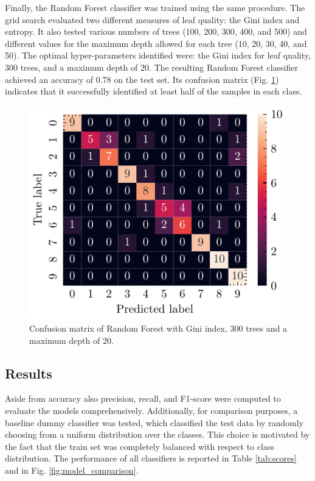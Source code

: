 \documentclass[journal]{IEEEtran}
\begin{document}
Finally, the Random Forest classifier was trained using the same procedure. The grid search evaluated two different measures of leaf quality: the Gini index and entropy. It also tested various numbers of trees (100, 200, 300, 400, and 500) and different values for the maximum depth allowed for each tree (10, 20, 30, 40, and 50). The optimal hyper-parameters identified were: the Gini index for leaf quality, 300 trees, and a maximum depth of 20. The resulting Random Forest classifier achieved an accuracy of 0.78 on the test set. Its confusion matrix (Fig. \ref{fig:rf_confusion_matrix}) indicates that it successfully identified at least half of the samples in each class.
\begin{figure}[ht]
    \centering
    \includegraphics[width=\linewidth]{confusion_matrix_rf.pdf}
    \caption{Confusion matrix of Random Forest with Gini index, 300 trees and a maximum depth of 20.}
    \label{fig:rf_confusion_matrix}
\end{figure}

\subsection{Results}
Aside from accuracy also precision, recall, and F1-score were computed to evaluate the models comprehensively. Additionally, for comparison purposes, a baseline dummy classifier was tested, which classified the test data by randomly choosing from a uniform distribution over the classes. This choice is motivated by the fact that the train set was completely balanced with respect to class distribution.
The performance of all classifiers is reported in Table \ref{tab:scores} and in Fig. \ref{fig:model_comparison}.
\end{document}

